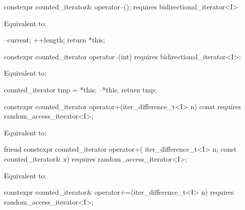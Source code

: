 %
\begin{itemdecl}
  constexpr counted_iterator& operator--();
    requires bidirectional_iterator<I>
\end{itemdecl}

\begin{itemdescr}
\pnum
\effects
Equivalent to:
\begin{codeblock}
--current;
++length;
return *this;
\end{codeblock}
\end{itemdescr}

%
\begin{itemdecl}
  constexpr counted_iterator operator--(int)
    requires bidirectional_iterator<I>;
\end{itemdecl}

\begin{itemdescr}
\pnum
\effects
Equivalent to:
\begin{codeblock}
counted_iterator tmp = *this;
--*this;
return tmp;
\end{codeblock}
\end{itemdescr}

%
\begin{itemdecl}
  constexpr counted_iterator operator+(iter_difference_t<I> n) const
    requires random_access_iterator<I>;
\end{itemdecl}

\begin{itemdescr}
\pnum
\effects
Equivalent to: 
\end{itemdescr}

%
\begin{itemdecl}
friend constexpr counted_iterator operator+(
  iter_difference_t<I> n, const counted_iterator& x)
    requires random_access_iterator<I>;
\end{itemdecl}

\begin{itemdescr}
\pnum
\effects
Equivalent to: 
\end{itemdescr}

%
\begin{itemdecl}
  constexpr counted_iterator& operator+=(iter_difference_t<I> n)
    requires random_access_iterator<I>;
\end{itemdecl}

